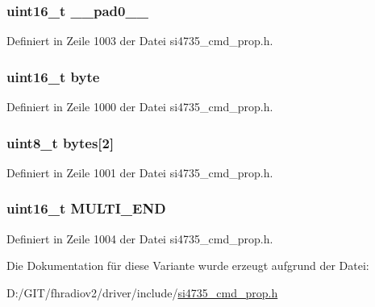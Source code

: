 \subsubsection[{\+\_\+\+\_\+pad0\+\_\+\+\_\+}]{\setlength{\rightskip}{0pt plus 5cm}uint16\+\_\+t \+\_\+\+\_\+pad0\+\_\+\+\_\+}\label{unionfm__hicut__multi__end__thres_a77132c2c26a75f5b8751b235cda23828}


Definiert in Zeile 1003 der Datei si4735\+\_\+cmd\+\_\+prop.\+h.

\hypertarget{unionfm__hicut__multi__end__thres_ab0549c1b5ea980a02e7eab77e21fea49}{}
\subsubsection[{byte}]{\setlength{\rightskip}{0pt plus 5cm}uint16\+\_\+t byte}\label{unionfm__hicut__multi__end__thres_ab0549c1b5ea980a02e7eab77e21fea49}


Definiert in Zeile 1000 der Datei si4735\+\_\+cmd\+\_\+prop.\+h.

\hypertarget{unionfm__hicut__multi__end__thres_a46e4c05d20a047ec169f60d3167e912e}{}
\subsubsection[{bytes}]{\setlength{\rightskip}{0pt plus 5cm}uint8\+\_\+t bytes\mbox{[}2\mbox{]}}\label{unionfm__hicut__multi__end__thres_a46e4c05d20a047ec169f60d3167e912e}


Definiert in Zeile 1001 der Datei si4735\+\_\+cmd\+\_\+prop.\+h.

\hypertarget{unionfm__hicut__multi__end__thres_a41a4c4055c9b6dc3abd9b7e1d0c77620}{}
\subsubsection[{M\+U\+L\+T\+I\+\_\+\+E\+N\+D}]{\setlength{\rightskip}{0pt plus 5cm}uint16\+\_\+t M\+U\+L\+T\+I\+\_\+\+E\+N\+D}\label{unionfm__hicut__multi__end__thres_a41a4c4055c9b6dc3abd9b7e1d0c77620}


Definiert in Zeile 1004 der Datei si4735\+\_\+cmd\+\_\+prop.\+h.



Die Dokumentation für diese Variante wurde erzeugt aufgrund der Datei\+:\begin{DoxyCompactItemize}
\item 
D\+:/\+G\+I\+T/fhradiov2/driver/include/\hyperlink{si4735__cmd__prop_8h}{si4735\+\_\+cmd\+\_\+prop.\+h}\end{DoxyCompactItemize}
